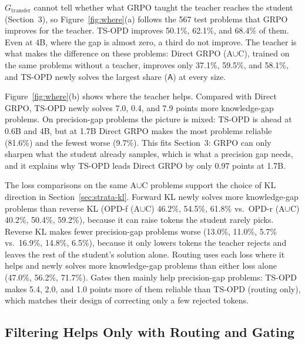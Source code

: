 \documentclass[10pt]{article}
\makeatletter
\newcommand{\avgk}{avg@$K$}
\newcommand{\tsopd}{TS-OPD}
\newcommand{\tsro}{TS-OPD (routing only)}
\newcommand{\AC}{A$\cup$C}
\newcommand{\Gt}{G_{\mathrm{transfer}}}
\newcommand{\tA}{\mathsf{A}}
\makeatother
\begin{document}
$\Gt$ cannot tell whether what GRPO taught the teacher reaches the student
(Section~3), so Figure~\ref{fig:where}(a) follows the 567 test problems
that GRPO improves for the teacher. \tsopd{} improves 50.1\%, 62.1\%, and 68.4\%
of them. Even at 4B, where the gap is almost zero, a third do not improve.
The teacher is what makes the difference on these problems: Direct GRPO (\AC), trained
on the same problems without a teacher, improves only 37.1\%, 59.5\%, and
58.1\%, and \tsopd{} newly solves the largest share ($\tA$) at every size.

Figure~\ref{fig:where}(b) shows where the teacher helps. Compared with Direct
GRPO, \tsopd{} newly solves 7.0, 0.4, and 7.9 points more knowledge-gap
problems. On precision-gap problems the picture is mixed: \tsopd{} is ahead at
0.6B and 4B, but at 1.7B Direct GRPO makes the most problems reliable (81.6\%)
and the fewest worse (9.7\%). This fits Section~3: GRPO can only sharpen what the
student already samples, which is what a precision gap needs, and it explains
why \tsopd{} leads Direct GRPO by only 0.97 points at 1.7B.

The loss comparisons on the same \AC{} problems support the choice of KL
direction in Section~\ref{sec:strata-kl}. Forward KL newly solves more
knowledge-gap problems than reverse KL (OPD-f (\AC) 46.2\%, 54.5\%, 61.8\% vs.\
OPD-r (\AC) 40.2\%, 50.4\%, 59.2\%), because it can raise tokens the student
rarely picks. Reverse KL makes fewer precision-gap problems worse (13.0\%,
11.0\%, 5.7\% vs.\ 16.9\%, 14.8\%, 6.5\%), because it only lowers tokens the
teacher rejects and leaves the rest of the student's solution alone. Routing
uses each loss where it helps and newly solves more knowledge-gap problems than
either loss alone (47.0\%, 56.2\%, 71.7\%). Gates then mainly help precision-gap
problems: \tsopd{} makes 5.4, 2.0, and 1.0 points more of them reliable than
\tsro{}, which matches their design of correcting only a few rejected tokens.

\subsection{Filtering Helps Only with Routing and Gating}
\label{sec:exp-components}

\begin{table}[t]
\centering
\small
\caption{Adding one component at a time: macro \avgk{} (\%) / $\Gt$ (points),
GRPO-8B teacher. All \AC{} rows use the same problems and steps.}
\label{tab:rq5}

\end{table}
\end{document}
